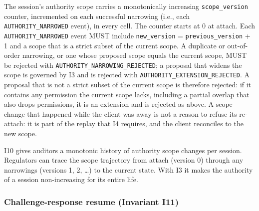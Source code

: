 \begin{invariant}\label{inv:I10}
The session's authority scope carries a monotonically increasing
\texttt{scope\_version} counter, incremented on each successful
narrowing (i.e., each \texttt{AUTHORITY\_NARROWED} event), in every
cell. The counter starts at 0 at attach. Each
\texttt{AUTHORITY\_NARROWED} event MUST include
\texttt{new\_version} = \texttt{previous\_version} + 1 and a scope that
is a strict subset of the current scope. A duplicate or out-of-order
narrowing, or one whose proposed scope equals the current scope, MUST be
rejected with \texttt{AUTHORITY\_NARROWING\_REJECTED}; a proposal that
widens the scope is governed by I3 and is rejected with
\texttt{AUTHORITY\_EXTENSION\_REJECTED}. A proposal that is not a strict
subset of the current scope is therefore rejected: if it contains any
permission the current scope lacks, including a partial overlap that also
drops permissions, it is an extension and is rejected as above. A scope change that happened
while the client was away is not a reason to refuse its re-attach: it is
part of the replay that I4 requires, and the client reconciles to the
new scope.
\end{invariant}

I10 gives auditors a monotonic history of authority scope changes per
session. Regulators can trace the scope trajectory from attach
(version 0) through any narrowings (versions 1, 2, \ldots) to the
current state. With I3 it makes the authority of a session
non-increasing for its entire life.

\subsubsection{Challenge-response resume (Invariant I11)}
\label{sec:invariants-token-auth}

